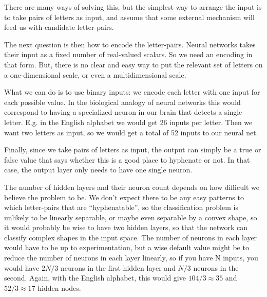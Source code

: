 \noindent
There are many ways of solving this, but the simplest way to arrange the input is to take pairs of letters as input, and assume that some external mechanism will feed us with candidate letter-pairs.

The next question is then how to encode the letter-pairs.
Neural networks takes their input as a fixed number of real-valued scalars.
So we need an encoding in that form.
But, there is no clear and easy way to put the relevant set of letters on a one-dimensional scale, or even a multidimensional scale.

What we can do is to use binary inputs: we encode each letter with one input for each possible value.
In the biological analogy of neural networks this would correspond to having a specialized neuron in our brain that detects a single letter.
E.g. in the English alphabet we would get 26 inputs per letter.
Then we want two letters as input, so we would get a total of 52 inputs to our neural net.

Finally, since we take pairs of letters as input, the output can simply be a true or false value that says whether this is a good place to hyphenate or not.
In that case, the output layer only needs to have one single neuron.

The number of hidden layers and their neuron count depends on how difficult we believe the problem to be.
We don’t expect there to be any easy patterns to which letter-pairs that are “hyphenatable”, so the classification problem is unlikely to be linearly separable, or maybe even separable by a convex shape, so it would probably be wise to have two hidden layers, so that the network can classify complex shapes in the input space.
The number of neurons in each layer would have to be up to experimentation, but a wise default value might be to reduce the number of neurons in each layer linearly, so if you have N inputs, you would have \(2N/3\) neurons in the first hidden layer and \(N/3\) neurons in the second.
Again, with the English alphabet, this would give \(104/3 \approx 35\) and \(52/3 \approx 17\) hidden nodes.



